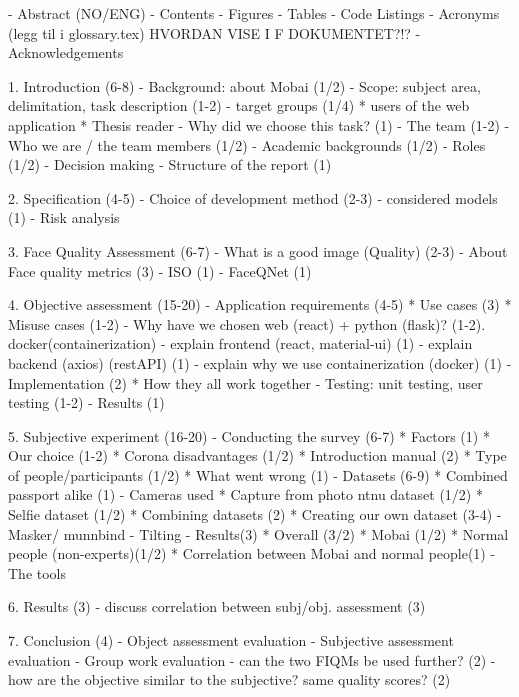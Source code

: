 - Abstract (NO/ENG)
- Contents
- Figures
- Tables
- Code Listings
- Acronyms (legg til i glossary.tex) HVORDAN VISE I F DOKUMENTET?!?
- Acknowledgements

1. Introduction (6-8)
 - Background: about Mobai (1/2)
 - Scope: subject area, delimitation, task description (1-2)
 - target groups (1/4)
    * users of the web application
    * Thesis reader
 - Why did we choose this task? (1)
 - The team (1-2)
   - Who we are / the team members (1/2)
   - Academic backgrounds (1/2)
   - Roles (1/2)
   - Decision making
 - Structure of the report (1)
 
 2. Specification (4-5)
    - Choice of development method (2-3) 
        - considered models (1)
    - Risk analysis
    
    
3. Face Quality Assessment (6-7)
    - What is a good image (Quality) (2-3)
    - About Face quality metrics (3)
        - ISO (1)
        - FaceQNet (1)
  
  
4. Objective assessment (15-20)
    - Application requirements (4-5)
        * Use cases (3)
        * Misuse cases (1-2)
    - Why have we chosen web (react) + python (flask)? (1-2). docker(containerization) 
    - explain frontend (react, material-ui) (1)
    - explain backend (axios) (restAPI) (1)
    - explain why we use containerization (docker) (1)
    - Implementation (2)
        * How they all work together
    - Testing: unit testing, user testing (1-2)
    - Results (1)
    

5. Subjective experiment (16-20)
   - Conducting the survey  (6-7)
        * Factors (1) 
        * Our choice (1-2) 
        * Corona disadvantages (1/2)
        * Introduction manual (2) 
        * Type of people/participants (1/2)
        * What went wrong (1)
    - Datasets (6-9)
        * Combined passport alike (1)
            - Cameras used
        * Capture from photo ntnu dataset (1/2)
        * Selfie dataset (1/2)
        * Combining datasets (2)
        * Creating our own dataset (3-4)
            - Masker/ munnbind 
            - Tilting 
    - Results(3) 
        * Overall (3/2)
        * Mobai (1/2)
        * Normal people (non-experts)(1/2)
        * Correlation between Mobai and normal people(1)
            - The tools
 
6. Results (3)
     - discuss correlation between subj/obj. assessment (3)
  
7. Conclusion (4)
    - Object assessment evaluation
    - Subjective assessment evaluation
    - Group work evaluation
    - can the two FIQMs be used further? (2)
    - how are the objective similar to the subjective? same quality scores? (2)
  
